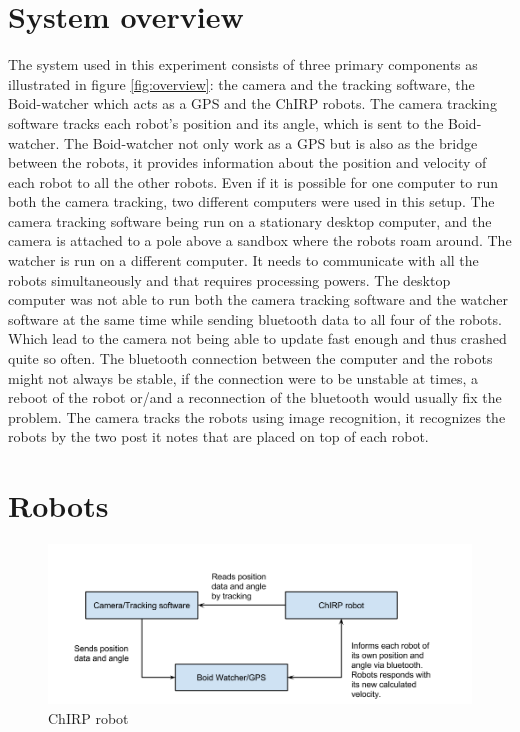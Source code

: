 \section{System overview}
\label{sec:overview}
The system used in this experiment consists of three primary components as illustrated in figure \ref{fig:overview}: the camera and the tracking software, the Boid-watcher which acts as a GPS and the ChIRP robots.
The camera tracking software tracks each robot's position and its angle, which is sent to the Boid-watcher. The Boid-watcher not only work as a GPS but is also as the bridge between the robots, it provides information about the position and velocity of each robot to all the other robots.
Even if it is possible for one computer to run both the camera tracking, two different computers were used in this setup. The camera tracking software being run on a stationary desktop computer, and the camera is attached to a pole above a sandbox where the robots roam around. The watcher is run on a different computer. It needs to communicate with all the robots simultaneously and that requires processing powers.
The desktop computer was not able to run both the camera tracking software and the watcher software at the same time while sending bluetooth data to all four of the robots. Which lead to the camera not being able to update fast enough and thus crashed quite so often. The bluetooth connection between the computer and the robots might not always be stable, if the connection were to be unstable at times, a reboot of the robot or/and a reconnection of the bluetooth would usually fix the problem.
The camera tracks the robots using image recognition, it recognizes the robots by the two post it notes that are placed on top of each robot. 

\section{Robots}
\label{sec:robot}
\begin{figure}[h]
\begin{center}
\includegraphics[width=0.8\linewidth]{figs/system_overview}
\end{center}
\caption[Robot]{ChIRP robot}
\label{fig:robot}
\end{figure}

